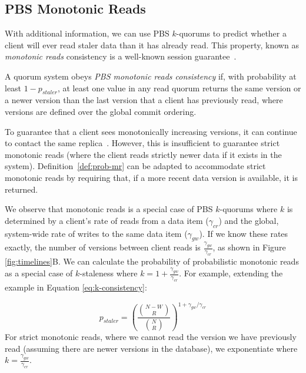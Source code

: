 \documentclass{vldb}
\begin{document}
\subsection{PBS Monotonic Reads}

With additional information, we can use PBS $k$-quorums to predict
whether a client will ever read staler data than it has already read.
This property, known as \textit{monotonic reads} consistency is a
well-known session guarantee~\cite{sessionguarantees}.

\begin{definition}
\label{def:prob-mr}
A quorum system obeys \textit{PBS monotonic reads consistency} if,
with probability at least $1-p_{staler}$, at least one value in any
read quorum returns the same version or a newer version than the last
version that a client has previously read, where versions are defined
over the global commit ordering.
\end{definition}

To guarantee that a client sees monotonically increasing versions, it
can continue to contact the same replica~\cite{vogels-defs}.  However,
this is insufficient to guarantee strict monotonic reads (where the
client reads strictly newer data if it exists in the system).
Definition~\ref{def:prob-mr} can be adapted to accommodate strict
monotonic reads by requiring that, if a more recent data version is
available, it is returned.

We observe that monotonic reads is a special case of PBS $k$-quorums
where $k$ is determined by a client's rate of reads from a data item
($\gamma_{cr}$) and the global, system-wide rate of writes to the same
data item ($\gamma_{gw}$).  If we know these rates exactly, the number
of versions between client reads is $\frac{\gamma_{gw}}{\gamma_{cr}}$,
as shown in Figure \ref{fig:timelines}B.  We can calculate the
probability of probabilistic monotonic reads as a special case of
$k$-staleness where $k=1+\frac{\gamma_{gw}}{\gamma_{cr}}$.  For
example, extending the example in Equation \ref{eq:k-consistency}:

\begin{equation}
\label{eq:prob-mr}
p_{staler} = \left(\frac{{N-W \choose R}}{{N \choose R}}\right)^{1+\gamma_{gw}/\gamma_{cr}}
\end{equation}
For strict monotonic reads, where we cannot read the version we have
previously read (assuming there are newer versions in the database),
we exponentiate where $k=\frac{\gamma_{gw}}{\gamma_{cr}}$.  
\end{document}
